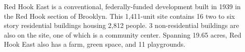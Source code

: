 Red Hook East is a conventional, federally-funded development built in 1939 in the Red Hook section of Brooklyn. This 1,411-unit site contains 16 two to six story residential buildings housing 2,812 people. 3 non-residential buildings are also on the site, one of which is a community center. Spanning 19.65 acres, Red Hook East also has a farm, green space, and 11 playgrounds.